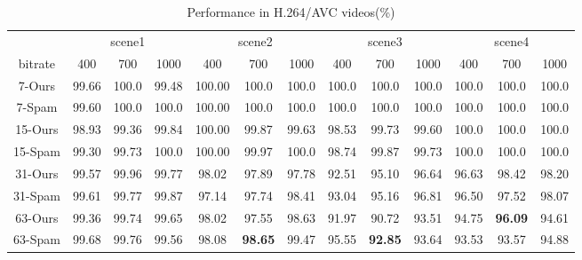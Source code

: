 \documentclass[pdftex,twocolumn,epjc3]{svjour3}          %
\begin{document}
\begin{table*}[b]
\renewcommand\arraystretch{1.5}
    \caption{Performance in H.264/AVC videos(\%)}\label{table:3}
    \begin{center}
        \begin{tabular*}{14.5cm}{ccccccccccccc}
            \hline
            \ & \multicolumn{3}{c}{scene1} & \multicolumn{3}{c}{scene2} & \multicolumn{3}{c}{scene3} &\multicolumn{3}{c}{scene4} \\ \cline{2-4}\cline{5-7}\cline{8-10}\cline{11-13}
            bitrate & 400 & 700 & 1000 & 400 & 700 & 1000 & 400 & 700 & 1000 & 400 & 700 & 1000 \\ \hline
            7-Ours & 99.66 & 100.0 & 99.48 & 100.00 & 100.0 & 100.0 & 100.0 & 100.0 & 100.0 & 100.0 & 100.0 & 100.0 \\
            7-Spam & 99.60 & 100.0 & 100.0 & 100.00 & 100.0 & 100.0 & 100.0 & 100.0 & 100.0 & 100.0 & 100.0 & 100.0 \\ \hline
            15-Ours & 98.93 & 99.36 & 99.84 & 100.00 & 99.87 & 99.63 & 98.53 & 99.73 & 99.60 & 100.0 & 100.0 & 100.0 \\
            15-Spam & 99.30 & 99.73 & 100.0 & 100.00 & 99.97 & 100.0 & 98.74 & 99.87 & 99.73 & 100.0 & 100.0 & 100.0 \\ \hline
            31-Ours & 99.57 & 99.96 & 99.77 & 98.02 & 97.89 & 97.78 & 92.51 & 95.10 & 96.64 & 96.63 & 98.42 & 98.20 \\
            31-Spam & 99.61 & 99.77 & 99.87 & 97.14 & 97.74 & 98.41 & 93.04 & 95.16 & 96.81 & 96.50 & 97.52 & 98.07 \\ \hline
            63-Ours & 99.36 & 99.74 & 99.65 & 98.02 & 97.55 & 98.63 & 91.97 & 90.72 & 93.51 & 94.75 & \textbf{96.09} & 94.61 \\
            63-Spam & 99.68 & 99.76 & 99.56 & 98.08 & \textbf{98.65} & 99.47 & 95.55 & \textbf{92.85} & 93.64 & 93.53 & 93.57 & 94.88
            \\ \hline
        \end{tabular*}
    \end{center}
\end{table*}
\end{document}
